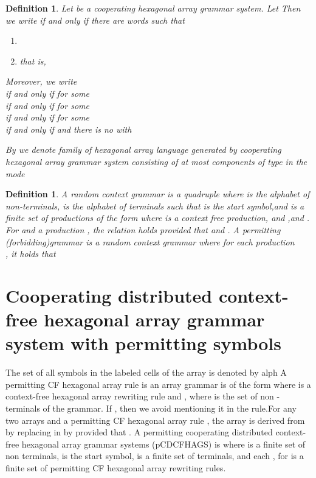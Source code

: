 \documentclass[11pt]{article}
\newtheorem{definition}[theorem]{Definition}
\begin{document}
\begin{definition}Let  be a cooperating hexagonal array grammar system. Let  Then we write  if and only if there are words  such that
\begin{enumerate}
\item  \item  that is,
 
\end{enumerate}

Moreover, we write\\
\indent\indent if and only if  for some \\
\indent\indent  if and only if  for some \\
\indent\indent  if and only if  for some \\
\indent\indent  if and only if  and there is no  with 

By  we denote family of hexagonal array language
generated by cooperating hexagonal array grammar system consisting
of at most  components of type  in the mode

\end{definition}
\begin{definition}
A random context grammar is a quadruple  where  is
the alphabet of non-terminals,  is the alphabet of terminals
such that  is the start symbol,and
 is a finite set of productions of the form  where  is a context free
production, and ,and .
For  and a production , the relation  holds provided
that  and . A
permitting (forbidding)grammar is a random context grammar
 where for each production\\ , it holds that 
\end{definition}



\section {Cooperating distributed context-free hexagonal array grammar system with permitting symbols}

The set of all symbols in the labeled cells of the array  is denoted by alph A permitting CF hexagonal
 array rule is an array grammar  is of the form  where 
 is a context-free hexagonal array rewriting rule and , where is the set of non -terminals of the grammar.
 If , then we avoid mentioning it in the rule.For any two arrays  and a  permitting CF hexagonal array rule
 , the array  is derived from  by replacing  in  by  provided that
 . A permitting cooperating distributed context-free hexagonal array grammar systems
 (pCDCFHAGS) is  where  is a finite  set of non terminals, is
 the start symbol, is a finite set of terminals,  and each , for  is a finite set
 of permitting CF hexagonal array rewriting rules.
\end{document}
